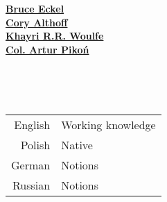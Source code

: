 \begin{leftcolumn*}
{{\begin{minipage}[l]{0.9\leftcolwidth}
                    {\href{https://www.linkedin.com/in/bruceeckel/}{\textbf{Bruce Eckel}}}
                \vspace{\itemspace}\\
                    {\href{https://www.linkedin.com/in/calthoff/}{\textbf{Cory Althoff}}}
                \vspace{\itemspace}\\
                    {\href{https://www.linkedin.com/in/krrw/}{\textbf{Khayri R.R. Woulfe}}}
                \vspace{\itemspace}\\
                    {\href{https://archiwum2019-10bkpanc.wp.mil.pl/pl/11.html}{\textbf{Col. Artur Pikoń}}}
                \vspace{\itemspace}\\
            \end{minipage}%
        }%
    }%
    \vspace{\itemspace}\\ 
    {\color{white} 
        \phantom{} \\%
        \begin{minipage}[r]{\leftcolwidth}
            \begin{tabular}{r|l}
                English & Working knowledge\\[0.3em]
                Polish & Native\\[0.3em]
                German & Notions\\[0.3em]
                Russian & Notions
            \end{tabular}
        \end{minipage}%
    }%
    \end{leftcolumn*}

